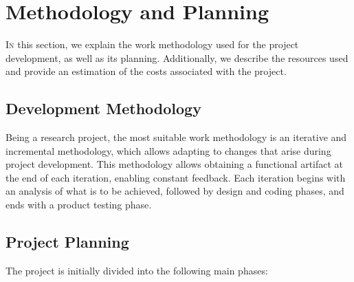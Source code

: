 \chapter{Methodology and Planning}
\label{chap:Metodoloxía e planificación}
\lettrine{I}{n} this section, we explain the work methodology used for the project development, as well as its planning.
Additionally, we describe the resources used and provide an estimation of the costs associated with the project.

\section{Development Methodology}
\label{sec:Metodoloxía do desenvolvemento}

Being a research project, the most suitable work methodology is an iterative and incremental methodology, which allows adapting to changes that arise during project development.
This methodology allows obtaining a functional artifact at the end of each iteration, enabling constant feedback.
Each iteration begins with an analysis of what is to be achieved, followed by design and coding phases, and ends with a product testing phase.

\section{Project Planning}
\label{sec:Planificación do proxecto}
The project is initially divided into the following main phases:

